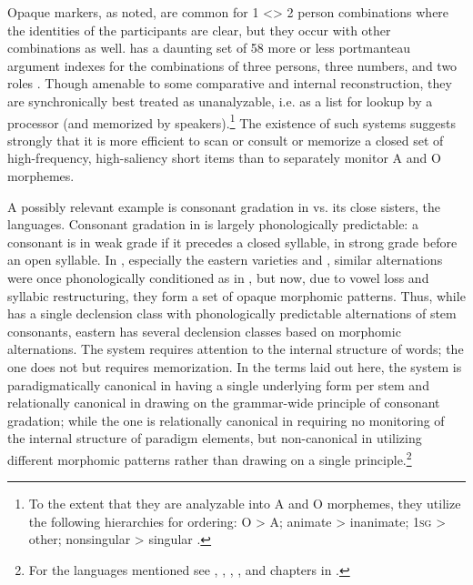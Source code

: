 \documentclass[output=paper,hidelinks]{langscibook}
\begin{document}
Opaque markers, as noted, are common for 1 <> 2 person combinations where the identities of the participants are clear, but they occur with other combinations as well.  has a daunting set of 58 more or less portmanteau argument indexes for the combinations of three persons, three numbers, and two roles \citep[109--137]{Watkins1984}.  Though amenable to some comparative and internal reconstruction, they are synchronically best treated as unanalyzable, i.e. as a list for lookup by a processor (and memorized by speakers).\footnote{To the extent that they are analyzable into A and O morphemes, they utilize the following hierarchies for ordering: O > A; animate > inanimate; 1\textsc{sg} > other; nonsingular > singular \citep{Watkins1984}.}   The existence of such systems suggests strongly that it is more efficient to scan or consult or memorize a closed set of high-frequency, high-saliency short items than to separately monitor A and O morphemes.

A possibly relevant example is consonant gradation in  vs. its close sisters, the  languages.  Consonant gradation in  is largely phonologically predictable: a consonant is in weak grade if it precedes a closed syllable, in strong grade before an open syllable.  In , especially the eastern varieties  and , similar alternations were once phonologically conditioned as in , but now, due to vowel loss and syllabic restructuring, they form a set of opaque morphomic patterns.  Thus, while  has a single declension class with phonologically predictable alternations of stem consonants, eastern  has several declension classes based on morphomic alternations.  The  system requires attention to the internal structure of words; the  one does not but requires memorization.  In the terms laid out here, the  system is paradigmatically canonical in having a single underlying form per stem and relationally canonical in drawing on the grammar-wide principle of consonant gradation; while the  one is relationally canonical in requiring no monitoring of the internal structure of paradigm elements, but non-canonical in utilizing different morphomic patterns rather than drawing on a single principle.\footnote{For the  languages mentioned see \citet{Sammallahti1998}, \citet{Nickel2011}, \citet{Feist2015}, \citet{Kert1971}, and chapters in \citet{Bakroinpress}. }  
\end{document}
